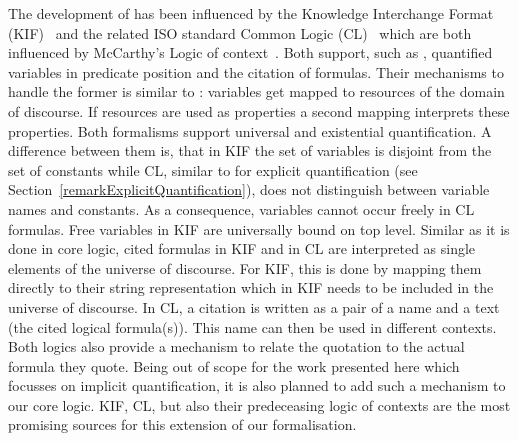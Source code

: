 The development of \nthreelogic has been influenced by the Knowledge Interchange Format (KIF)~\cite{kif} and the related ISO standard Common Logic (CL)~\cite{ICL}
which are both influenced by McCarthy's Logic of context~\cite{mccarthy}. 
Both support,
such as \nthree, quantified variables in predicate position and the citation of formulas. Their mechanisms to handle the former is similar to \rdf: 
variables get mapped to resources of the domain of discourse. If resources are used as properties a second mapping interprets these properties. Both formalisms support universal and
existential quantification. A difference between them is, that in KIF the set of variables is disjoint from the set of constants 
while CL, similar to \nthree for explicit 
quantification (see Section~\ref{remarkExplicitQuantification}), does not distinguish between variable names and constants. As a consequence, variables cannot occur freely
in CL formulas. Free variables in KIF are universally bound on top level.
%
Similar as it is done in core logic, cited formulas in KIF and in CL are interpreted as single elements of the universe of discourse. 
For KIF, this is done by mapping them directly to their string representation which in KIF needs to be included in the universe of discourse. In CL, a citation
is written as a pair of a name and a text (the cited logical formula(s)). This name can then be used in different contexts.  %
Both logics also provide a mechanism to relate the quotation to the actual formula they quote. Being out of scope for the work presented here which focusses 
on implicit quantification, it is also planned to add such a mechanism to our core logic. KIF, CL, but also their predeceasing logic of contexts are the most promising sources 
for this extension of our formalisation.


